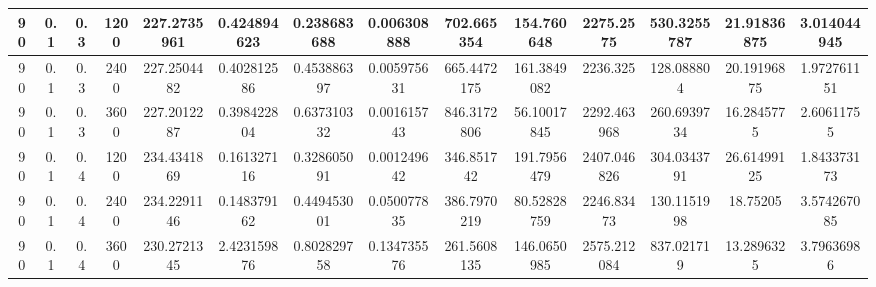\documentclass[main.tex]{subfiles}
\begin{document}
\begin{table}[ht]
\begin{tabular}{cccccccccccccc}
		\multicolumn{1}{|c|}{90} & \multicolumn{1}{c|}{0.1} & \multicolumn{1}{c|}{0.3} & \multicolumn{1}{c|}{1200} & \multicolumn{1}{c|}{227.2735961} & \multicolumn{1}{c|}{0.424894623} & \multicolumn{1}{c|}{0.238683688} & \multicolumn{1}{c|}{0.006308888} & \multicolumn{1}{c|}{702.665354}  & \multicolumn{1}{c|}{154.760648}  & \multicolumn{1}{c|}{2275.2575}   & \multicolumn{1}{c|}{530.3255787} & \multicolumn{1}{c|}{21.91836875} & \multicolumn{1}{c|}{3.014044945} \\ \hline
		\multicolumn{1}{|c|}{90} & \multicolumn{1}{c|}{0.1} & \multicolumn{1}{c|}{0.3} & \multicolumn{1}{c|}{2400} & \multicolumn{1}{c|}{227.2504482} & \multicolumn{1}{c|}{0.402812586} & \multicolumn{1}{c|}{0.453886397} & \multicolumn{1}{c|}{0.005975631} & \multicolumn{1}{c|}{665.4472175} & \multicolumn{1}{c|}{161.3849082} & \multicolumn{1}{c|}{2236.325}    & \multicolumn{1}{c|}{128.088804}  & \multicolumn{1}{c|}{20.19196875} & \multicolumn{1}{c|}{1.972761151} \\ \hline
		\multicolumn{1}{|c|}{90} & \multicolumn{1}{c|}{0.1} & \multicolumn{1}{c|}{0.3} & \multicolumn{1}{c|}{3600} & \multicolumn{1}{c|}{227.2012287} & \multicolumn{1}{c|}{0.398422804} & \multicolumn{1}{c|}{0.637310332} & \multicolumn{1}{c|}{0.001615743} & \multicolumn{1}{c|}{846.3172806} & \multicolumn{1}{c|}{56.10017845} & \multicolumn{1}{c|}{2292.463968} & \multicolumn{1}{c|}{260.6939734} & \multicolumn{1}{c|}{16.2845775}  & \multicolumn{1}{c|}{2.60611755}  \\ \hline
		\multicolumn{1}{|c|}{90} & \multicolumn{1}{c|}{0.1} & \multicolumn{1}{c|}{0.4} & \multicolumn{1}{c|}{1200} & \multicolumn{1}{c|}{234.4341869} & \multicolumn{1}{c|}{0.161327116} & \multicolumn{1}{c|}{0.328605091} & \multicolumn{1}{c|}{0.001249642} & \multicolumn{1}{c|}{346.851742}  & \multicolumn{1}{c|}{191.7956479} & \multicolumn{1}{c|}{2407.046826} & \multicolumn{1}{c|}{304.0343791} & \multicolumn{1}{c|}{26.61499125} & \multicolumn{1}{c|}{1.843373173} \\ \hline
		\multicolumn{1}{|c|}{90} & \multicolumn{1}{c|}{0.1} & \multicolumn{1}{c|}{0.4} & \multicolumn{1}{c|}{2400} & \multicolumn{1}{c|}{234.2291146} & \multicolumn{1}{c|}{0.148379162} & \multicolumn{1}{c|}{0.449453001} & \multicolumn{1}{c|}{0.050077835} & \multicolumn{1}{c|}{386.7970219} & \multicolumn{1}{c|}{80.52828759} & \multicolumn{1}{c|}{2246.83473}  & \multicolumn{1}{c|}{130.1151998} & \multicolumn{1}{c|}{18.75205}    & \multicolumn{1}{c|}{3.574267085} \\ \hline
		\multicolumn{1}{|c|}{90} & \multicolumn{1}{c|}{0.1} & \multicolumn{1}{c|}{0.4} & \multicolumn{1}{c|}{3600} & \multicolumn{1}{c|}{230.2721345} & \multicolumn{1}{c|}{2.423159876} & \multicolumn{1}{c|}{0.802829758} & \multicolumn{1}{c|}{0.134735576} & \multicolumn{1}{c|}{261.5608135} & \multicolumn{1}{c|}{146.0650985} & \multicolumn{1}{c|}{2575.212084} & \multicolumn{1}{c|}{837.021719}  & \multicolumn{1}{c|}{13.2896325}  & \multicolumn{1}{c|}{3.79636986}  \\ \hline

\end{tabular}
\end{table}
\end{document}

